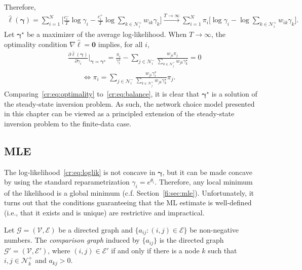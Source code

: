 Therefore,
\begin{align*}
\hat{\ell}(\bm{\gamma})
    = \sum_{i = 1}^N \bigg[ \frac{c^-_i}{T} \log \gamma_i - \frac{c^+_i}{T} \log \sum_{k \in \mathcal{N}^+_i} w_{ik} \gamma_k \bigg]
    \xrightarrow{T \to \infty} \sum_{i = 1}^N \pi_i \bigg[ \log \gamma_i - \log \sum_{k \in \mathcal{N}^+_i} w_{ik} \gamma_k \bigg].
\end{align*}
Let $\bm{\gamma}^\star$ be a maximizer of the average log-likelihood.
When $T \to \infty$, the optimality condition $\nabla \hat{\ell} = \bm{0}$ implies, for all $i$,
\begin{align}
&\frac{\partial \hat{\ell}(\bm{\gamma})}{\partial \gamma_i} \bigg|_{\bm{\gamma} = \bm{\gamma}^\star}
    = \frac{\pi_i}{\gamma^\star_i} - \sum_{j \in \mathcal{N}^-_i} \frac{w_{ji} \pi_j}{\sum_{k \in \mathcal{N}^+_j} w_{jk} \gamma^\star_k}
    = 0 \nonumber \\
&\qquad \iff \pi_i = \sum_{j \in \mathcal{N}^-_i} \frac{w_{ji} \gamma^\star_i}{\sum_{k \in \mathcal{N}^+_j} w_{jk} \gamma^\star_k} \pi_j. \label{cr:eq:optimality}
\end{align}
Comparing~\eqref{cr:eq:optimality} to~\eqref{cr:eq:balance}, it is clear that $\bm{\gamma}^\star$ is a solution of the steady-state inversion problem.
As such, the network choice model presented in this chapter can be viewed as a principled extension of the steady-state inversion problem to the finite-data case.


\subsection{MLE}
\label{cr:sec:maxlik}

The log-likelihood~\eqref{cr:eq:loglik} is not concave in $\bm{\gamma}$, but it can be made concave by using the standard reparametrization $\gamma_i = e^{\theta_i}$.
Therefore, any local minimum of the likelihood is a global minimum (c.f. Section~\ref{fi:sec:mle}).
Unfortunately, it turns out that the conditions guaranteeing that the ML estimate is well-defined (i.e., that it exists and is unique) are restrictive and impractical.

\begin{definition}
Let $\mathcal{G} = (\mathcal{V}, \mathcal{E})$ be a directed graph and $\{ a_{ij} : (i,j) \in \mathcal{E} \}$ be non-negative numbers.
The \emph{comparison graph} induced by $\{ a_{ij} \}$ is the directed graph $\mathcal{G}' = (\mathcal{V}, \mathcal{E}')$, where $(i,j) \in \mathcal{E}'$ if and only if there is a node $k$ such that $i, j \in \mathcal{N}^+_k$ and $a_{kj} > 0$.
\end{definition}

